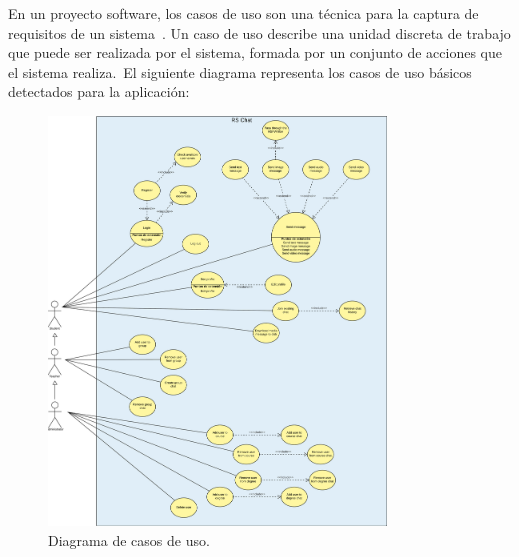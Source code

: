 
En un proyecto software, los casos de uso son una técnica para la captura de requisitos de un sistema~\cite{use_cases}.
Un caso de uso describe una unidad discreta de trabajo que puede ser realizada por el sistema, formada por un conjunto
de acciones que el sistema realiza.\ El siguiente diagrama representa los casos de uso básicos detectados para
la aplicación:

\begin{figure}[H]
	\centering
	\includegraphics[width=0.8\textwidth]{res/images/RSChat-Diagrams-Usecases}
	\caption{Diagrama de casos de uso.}
	\label{fig:casosDeUso}
\end{figure}

